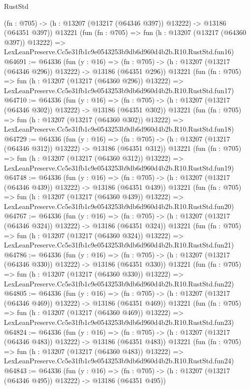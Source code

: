 \begin{lexlean}{RustStd}
\begin{coremodule}
    (fn : @705) -> (h : @13207 (@13217 (@64346 @397)) @13222) -> @13186 (@64351 @397))
    @13221
    (fun (fn : @705) =>
    fun (h : @13207 (@13217 (@64360 @397)) @13222) =>
    LexLeanPreserve.Cc5e31fb1c9e0543253b9db6d960d4b2b.R10.RustStd.fun16)
@64691 := @64336
    (fun (y : @16) =>
    (fn : @705) -> (h : @13207 (@13217 (@64346 @296)) @13222) -> @13186 (@64351 @296))
    @13221
    (fun (fn : @705) =>
    fun (h : @13207 (@13217 (@64360 @296)) @13222) =>
    LexLeanPreserve.Cc5e31fb1c9e0543253b9db6d960d4b2b.R10.RustStd.fun17)
@64710 := @64336
    (fun (y : @16) =>
    (fn : @705) -> (h : @13207 (@13217 (@64346 @302)) @13222) -> @13186 (@64351 @302))
    @13221
    (fun (fn : @705) =>
    fun (h : @13207 (@13217 (@64360 @302)) @13222) =>
    LexLeanPreserve.Cc5e31fb1c9e0543253b9db6d960d4b2b.R10.RustStd.fun18)
@64729 := @64336
    (fun (y : @16) =>
    (fn : @705) -> (h : @13207 (@13217 (@64346 @312)) @13222) -> @13186 (@64351 @312))
    @13221
    (fun (fn : @705) =>
    fun (h : @13207 (@13217 (@64360 @312)) @13222) =>
    LexLeanPreserve.Cc5e31fb1c9e0543253b9db6d960d4b2b.R10.RustStd.fun19)
@64748 := @64336
    (fun (y : @16) =>
    (fn : @705) -> (h : @13207 (@13217 (@64346 @439)) @13222) -> @13186 (@64351 @439))
    @13221
    (fun (fn : @705) =>
    fun (h : @13207 (@13217 (@64360 @439)) @13222) =>
    LexLeanPreserve.Cc5e31fb1c9e0543253b9db6d960d4b2b.R10.RustStd.fun20)
@64767 := @64336
    (fun (y : @16) =>
    (fn : @705) -> (h : @13207 (@13217 (@64346 @324)) @13222) -> @13186 (@64351 @324))
    @13221
    (fun (fn : @705) =>
    fun (h : @13207 (@13217 (@64360 @324)) @13222) =>
    LexLeanPreserve.Cc5e31fb1c9e0543253b9db6d960d4b2b.R10.RustStd.fun21)
@64786 := @64336
    (fun (y : @16) =>
    (fn : @705) -> (h : @13207 (@13217 (@64346 @330)) @13222) -> @13186 (@64351 @330))
    @13221
    (fun (fn : @705) =>
    fun (h : @13207 (@13217 (@64360 @330)) @13222) =>
    LexLeanPreserve.Cc5e31fb1c9e0543253b9db6d960d4b2b.R10.RustStd.fun22)
@64805 := @64336
    (fun (y : @16) =>
    (fn : @705) -> (h : @13207 (@13217 (@64346 @469)) @13222) -> @13186 (@64351 @469))
    @13221
    (fun (fn : @705) =>
    fun (h : @13207 (@13217 (@64360 @469)) @13222) =>
    LexLeanPreserve.Cc5e31fb1c9e0543253b9db6d960d4b2b.R10.RustStd.fun23)
@64824 := @64336
    (fun (y : @16) =>
    (fn : @705) -> (h : @13207 (@13217 (@64346 @483)) @13222) -> @13186 (@64351 @483))
    @13221
    (fun (fn : @705) =>
    fun (h : @13207 (@13217 (@64360 @483)) @13222) =>
    LexLeanPreserve.Cc5e31fb1c9e0543253b9db6d960d4b2b.R10.RustStd.fun24)
@64843 := @64336
    (fun (y : @16) =>
    (fn : @705) -> (h : @13207 (@13217 (@64346 @495)) @13222) -> @13186 (@64351 @495))

\end{coremodule}
\end{lexlean}

